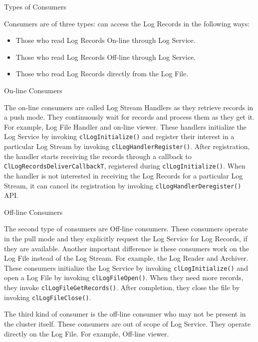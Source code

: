 \begin{flushleft}
\begin{Desc}
\item[Types of Consumers]
\end{Desc}
Consumers are of three types: can access the Log Records in the following ways:
\begin{itemize}
\item
Those who read Log Records On-line through Log Service.
\item
Those who read Log Records Off-line through Log Service.
\item
Those who read Log Records directly from the Log File.
\end{itemize}

\begin{description}
\item [On-line Consumers]
\end{description}

The on-line consumers are called Log Stream Handlers as they retrieve records in a push mode. They continuously wait for records and 
process them as they get it. For example, Log File Handler and on-line viewer. These handlers initialize the Log Service by
invoking {\tt{clLogInitialize()}} and register their interest in a particular Log Stream by invoking {\tt{clLogHandlerRegister()}}. 
After registration, the handler starts receiving the records through a callback to {\tt{ClLogRecordsDeliverCallbackT}}, registered 
during {\tt{clLogInitialize()}}. When the handler is not interested in receiving the Log Records for a particular Log Stream, 
it can cancel its registration by invoking {\tt{clLogHandlerDeregister()}} API.

\begin{description}
\item [Off-line Consumers]
\end{description}

The second type of consumers are Off-line consumers. These consumers operate in the pull mode and they explicitly request the Log Service
for Log Records, if they are available. Another important difference is these consumers work on the Log File instead of the Log Stream. 
For example, the Log Reader and Archiver. These consumers initialize the Log Service by invoking {\tt{clLogInitialize()}} and open a 
Log File by invoking {\tt{clLogFileOpen()}}. When they need more records, they invoke {\tt{clLogFileGetRecords()}}. After completion, 
they close the file by invoking {\tt{clLogFileClose()}}.
\par
The third kind of consumer is the off-line consumer who may not be present in the cluster itself. These consumers are out of scope of Log Service. 
They operate directly on the Log File. For example, Off-line viewer. 


\end{flushleft}
